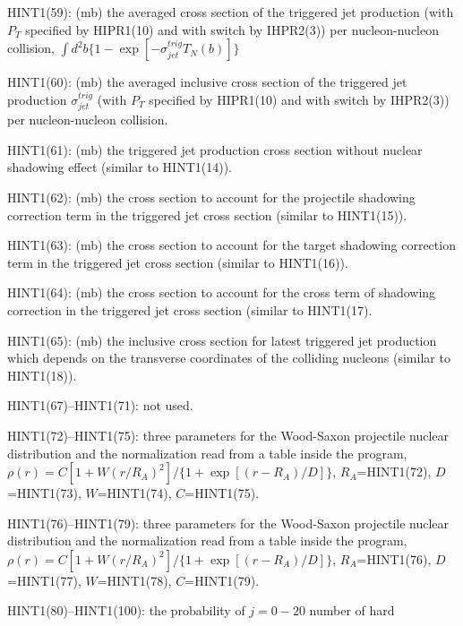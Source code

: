 \begin{description}
\item{}HINT1(59): (mb) the averaged cross section of the 
                triggered jet production (with $P_T$ specified by HIPR1(10)
                and with switch by IHPR2(3)) per nucleon-nucleon
                collision,
                $\int d^2b\{1-\exp[-\sigma_{jet}^{trig}T_N(b)]\}$
\item{}HINT1(60): (mb) the averaged inclusive cross section of the 
                triggered jet production $\sigma_{jet}^{trig}$
                (with $P_T$ specified by 
                HIPR1(10) and with switch by IHPR2(3)) per
                nucleon-nucleon collision.
\item{}HINT1(61): (mb) the triggered jet production cross section without
                nuclear shadowing effect (similar to HINT1(14)).
\item{}HINT1(62): (mb) the cross section to account for the projectile 
                shadowing correction term in the triggered jet cross 
                section (similar to HINT1(15)).
\item{}HINT1(63): (mb) the cross section to account for the target 
                shadowing correction term in the triggered jet cross 
                section (similar to HINT1(16)).
\item{}HINT1(64): (mb) the cross section to account for the cross
                term of shadowing correction in the triggered jet 
                cross section (similar to HINT1(17).
\item{}HINT1(65): (mb) the inclusive cross section for latest triggered
                jet production which depends on the transverse coordinates
                of the colliding nucleons (similar to HINT1(18)).
\item{}HINT1(67)--HINT1(71): not used.
\item{}HINT1(72)--HINT1(75): three parameters for the Wood-Saxon
                projectile nuclear distribution and the normalization
                read from a table inside the program,
                $\rho(r)=C[1+W(r/R_A)^2]/\{1+\exp[(r-R_A)/D]\}$,
                $R_A$=HINT1(72), $D$=HINT1(73), $W$=HINT1(74), $C$=HINT1(75).
\item{}HINT1(76)--HINT1(79): three parameters for the Wood-Saxon
                projectile nuclear distribution and the normalization
                read from a table inside the program,
                $\rho(r)=C[1+W(r/R_A)^2]/\{1+\exp[(r-R_A)/D]\}$,
                $R_A$=HINT1(76), $D$=HINT1(77), $W$=HINT1(78), $C$=HINT1(79).
\item{}HINT1(80)--HINT1(100): the probability of $j=0-20$ number of hard

\end{description}
